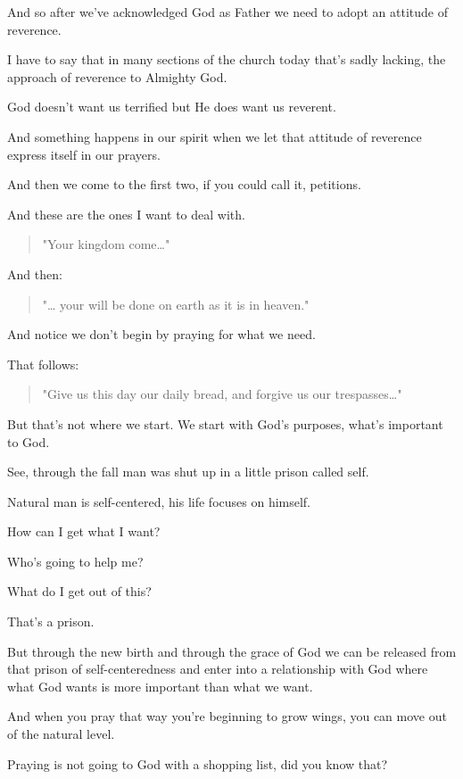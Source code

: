 \documentclass[11pt]{article}
\begin{document}
And so after we've acknowledged God as Father
we need to adopt an attitude of reverence.

I have to say that in many sections of the
church today that's sadly lacking, the
approach of reverence to Almighty God.

God doesn't want us terrified but He does want
us reverent.

And something happens in our spirit when we
let that attitude of reverence express itself
in our prayers.

And then we come to the first two, if you
could call it, petitions.

And these are the ones I want to deal with.

\begin{quote}
"Your kingdom come\ldots{}"
\end{quote}

And then:

\begin{quote}
"\ldots{} your will be done on earth as it is in heaven."
\end{quote}

And notice we don't begin by praying
for what we need.

That follows:

\begin{quote}
"Give us this day our daily bread, and forgive us our trespasses\ldots{}"
\end{quote}

But that's not where we start.
We start with God's purposes, what's important
to God.

See, through the fall man was shut up in a
little prison called self.

Natural man is self-centered, his life focuses
on himself.

How can I get what I want?

Who's going to help me?

What do I get out of this?

That's a prison.

But through the new birth and through the
grace of God we can be released from that
prison of self-centeredness and enter into a
relationship with God where what God wants is
more important than what we want.

And when you pray that way you're beginning to
grow wings, you can move out of the natural
level.

Praying is not going to God with a shopping
list, did you know that?
\end{document}
